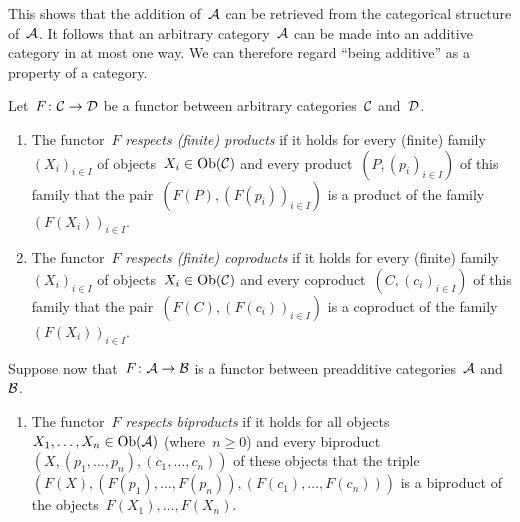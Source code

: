 \begin{remark}
  This shows that the addition of~$\mathcal{A}$ can be retrieved from the categorical structure of~$\mathcal{A}$.
  It follows that an arbitrary category~$\mathcal{A}$ can be made into an additive category in at most one way.
  We can therefore regard \enquote{being additive} as a property of a category.
\end{remark}


\begin{definition}
  Let~$F \colon \mathcal{C} \to \mathcal{D}$ be a functor between arbitrary categories~$\mathcal{C}$ and~$\mathcal{D}$.
  \begin{enumerate}
    \item
      The functor~$F$ \emph{respects \textup(finite\textup) products} if it holds for every (finite) family~$(X_i)_{i \in I}$ of objects~$X_i \in \operatorname{Ob}(\mathcal{C})$ and every product~$(P, (p_i)_{i \in I})$ of this family that the pair~$(F(P), (F(p_i))_{i \in I})$ is a product of the family~$(F(X_i))_{i \in I}$.
    \item
      The functor~$F$ \emph{respects \textup(finite\textup) coproducts} if it holds for every (finite) family~$(X_i)_{i \in I}$ of objects~$X_i \in \operatorname{Ob}(\mathcal{C})$ and every coproduct~$(C, (c_i)_{i \in I})$ of this family that the pair~$(F(C), (F(c_i))_{i \in I})$ is a coproduct of the family~$(F(X_i))_{i \in I}$.
  \end{enumerate}
  Suppose now that~$F \colon \mathcal{A} \to \mathcal{B}$ is a functor between preadditive categories~$\mathcal{A}$ and~$\mathcal{B}$.
  \begin{enumerate}[resume]
    \item
      The functor~$F$ \emph{respects biproducts} if it holds for all objects~$X_1, \dotsc, X_n \in \operatorname{Ob}(\mathcal{A})$ (where~$n \geq 0$) and every biproduct~$(X, (p_1, \dotsc, p_n), (c_1, \dotsc, c_n))$ of these objects that the triple~$(F(X), (F(p_1), \dotsc, F(p_n)), (F(c_1), \dotsc, F(c_n)))$ is a biproduct of the objects~$F(X_1), \dotsc, F(X_n)$.
  \end{enumerate}
\end{definition}


